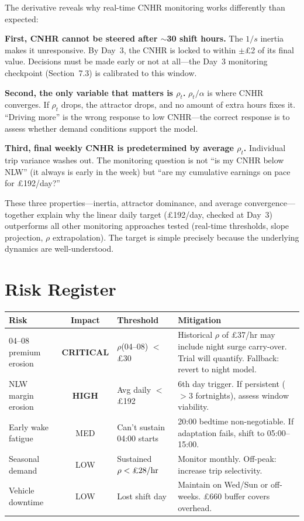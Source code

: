 \documentclass[a4paper,11pt]{article}
\begin{document}
The derivative reveals why real-time CNHR monitoring works differently than expected:

\textbf{First, CNHR cannot be steered after $\sim$30 shift hours.} The $1/s$ inertia makes it unresponsive. By Day~3, the CNHR is locked to within $\pm$\pounds2 of its final value. Decisions must be made early or not at all---the Day~3 monitoring checkpoint (Section~7.3) is calibrated to this window.

\textbf{Second, the only variable that matters is $\rho_t$.} $\rho_t / \alpha$ is where CNHR converges. If $\rho_t$ drops, the attractor drops, and no amount of extra hours fixes it. ``Driving more'' is the wrong response to low CNHR---the correct response is to assess whether demand conditions support the model.

\textbf{Third, final weekly CNHR is predetermined by average $\rho_t$.} Individual trip variance washes out. The monitoring question is not ``is my CNHR below NLW'' (it always is early in the week) but ``are my cumulative earnings on pace for \pounds192/day?''

These three properties---inertia, attractor dominance, and average convergence---together explain why the linear daily target (\pounds192/day, checked at Day~3) outperforms all other monitoring approaches tested (real-time thresholds, slope projection, $\rho$ extrapolation). The target is simple precisely because the underlying dynamics are well-understood.

\newpage

\section{Risk Register}

\begin{tabularx}{\textwidth}{l c l X}
\toprule
\textbf{Risk} & \textbf{Impact} & \textbf{Threshold} & \textbf{Mitigation} \\
\midrule
04--08 premium erosion & \cellcolor{redbg}\textbf{CRITICAL} & $\rho$(04--08) $<$ \pounds30 & Historical $\rho$ of \pounds37/hr may include night surge carry-over. Trial will quantify. Fallback: revert to night model. \\
\addlinespace
NLW margin erosion & \cellcolor{redbg}\textbf{HIGH} & Avg daily $<$ \pounds192 & 6th day trigger. If persistent ($>$3 fortnights), assess window viability. \\
\addlinespace
Early wake fatigue & \cellcolor{amberbg}MED & Can't sustain 04:00 starts & 20:00 bedtime non-negotiable. If adaptation fails, shift to 05:00--15:00. \\
\addlinespace
Seasonal demand & \cellcolor{greenbg}LOW & Sustained $\rho < \text{\pounds28/hr}$ & Monitor monthly. Off-peak: increase trip selectivity. \\
\addlinespace
Vehicle downtime & \cellcolor{greenbg}LOW & Lost shift day & Maintain on Wed/Sun or off-weeks. \pounds660 buffer covers overhead. \\
\bottomrule
\end{tabularx}
\end{document}
